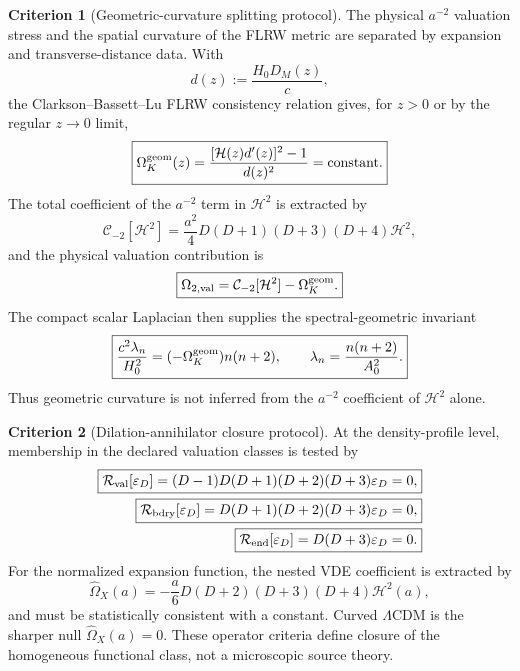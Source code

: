 \documentclass[11pt,a4paper]{article}
\def\Dil{D}%
\numberwithin{equation}{section}
\theoremstyle{definition}
\newtheorem{criterion}{Criterion}
\theoremstyle{plain}
\theoremstyle{remark}
\newcommand{\Dil}{\mathscr{D}}
\newcommand{\epsD}{\varepsilon_D}
\begin{document}
\begin{criterion}[Geometric-curvature splitting protocol]
The physical \(a^{-2}\) valuation stress and the spatial curvature of the FLRW metric are separated by expansion and transverse-distance data.  With
\begin{equation}
d(z):=\frac{H_0D_M(z)}{c},
\end{equation}
the Clarkson--Bassett--Lu FLRW consistency relation gives, for \(z>0\) or by the regular \(z\to0\) limit,
\begin{equation}
\boxed{
\Omega_K^{\rm geom}(z)=
\frac{[\mathcal H(z)d'(z)]^2-1}{d(z)^2}=\text{constant}.
}
\end{equation}
The total coefficient of the \(a^{-2}\) term in \(\mathcal H^2\) is extracted by
\begin{equation}
\boxed{
\mathcal C_{-2}[\mathcal H^2]
=\frac{a^2}{4}\Dil(\Dil+1)(\Dil+3)(\Dil+4)\mathcal H^2,
}
\end{equation}
and the physical valuation contribution is
\begin{equation}
\boxed{
\Omega_{2,\rm val}=\mathcal C_{-2}[\mathcal H^2]-\Omega_K^{\rm geom}.
}
\end{equation}
The compact scalar Laplacian then supplies the spectral-geometric invariant
\begin{equation}
\boxed{
\frac{c^2\lambda_n}{H_0^2}=(-\Omega_K^{\rm geom})n(n+2),
\qquad
\lambda_n=\frac{n(n+2)}{A_0^2}.
}
\end{equation}
Thus geometric curvature is not inferred from the \(a^{-2}\) coefficient of \(\mathcal H^2\) alone.
\end{criterion}

\begin{criterion}[Dilation-annihilator closure protocol]
At the density-profile level, membership in the declared valuation classes is tested by
\begin{align}
\boxed{\mathcal R_{\rm val}[\epsD]
=(\Dil-1)\Dil(\Dil+1)(\Dil+2)(\Dil+3)\epsD=0,}\\
\boxed{\mathcal R_{\rm bdry}[\epsD]
=\Dil(\Dil+1)(\Dil+2)(\Dil+3)\epsD=0,}\\
\boxed{\mathcal R_{\rm end}[\epsD]
=\Dil(\Dil+3)\epsD=0.}
\end{align}
For the normalized expansion function, the nested VDE coefficient is extracted by
\begin{equation}
\boxed{
\widehat\Omega_X(a)=
-\frac a6\Dil(\Dil+2)(\Dil+3)(\Dil+4)\mathcal H^2(a),
}
\end{equation}
and must be statistically consistent with a constant.  Curved \(\Lambda\textrm{CDM}\) is the sharper null \(\widehat\Omega_X(a)=0\).  These operator criteria define closure of the homogeneous functional class, not a microscopic source theory.
\end{criterion}
\end{document}
